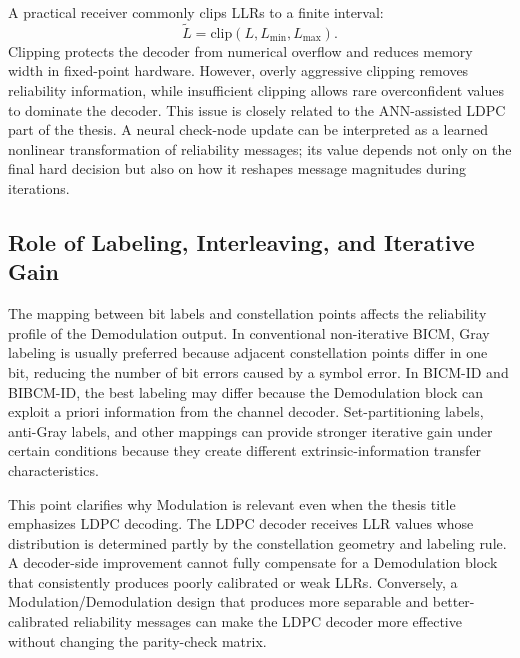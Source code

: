 A practical receiver commonly clips LLRs to a finite interval:
\begin{equation}
  \tilde{L}=\mathrm{clip}(L,L_{\min},L_{\max}).
\end{equation}
Clipping protects the decoder from numerical overflow and reduces memory width in fixed-point hardware. However, overly aggressive clipping removes reliability information, while insufficient clipping allows rare overconfident values to dominate the decoder. This issue is closely related to the ANN-assisted LDPC part of the thesis. A neural check-node update can be interpreted as a learned nonlinear transformation of reliability messages; its value depends not only on the final hard decision but also on how it reshapes message magnitudes during iterations.

\subsection{Role of Labeling, Interleaving, and Iterative Gain}
The mapping between bit labels and constellation points affects the reliability profile of the Demodulation output. In conventional non-iterative BICM, Gray labeling is usually preferred because adjacent constellation points differ in one bit, reducing the number of bit errors caused by a symbol error. In BICM-ID and BIBCM-ID, the best labeling may differ because the Demodulation block can exploit a priori information from the channel decoder. Set-partitioning labels, anti-Gray labels, and other mappings can provide stronger iterative gain under certain conditions because they create different extrinsic-information transfer characteristics.

This point clarifies why Modulation is relevant even when the thesis title emphasizes LDPC decoding. The LDPC decoder receives LLR values whose distribution is determined partly by the constellation geometry and labeling rule. A decoder-side improvement cannot fully compensate for a Demodulation block that consistently produces poorly calibrated or weak LLRs. Conversely, a Modulation/Demodulation design that produces more separable and better-calibrated reliability messages can make the LDPC decoder more effective without changing the parity-check matrix.

